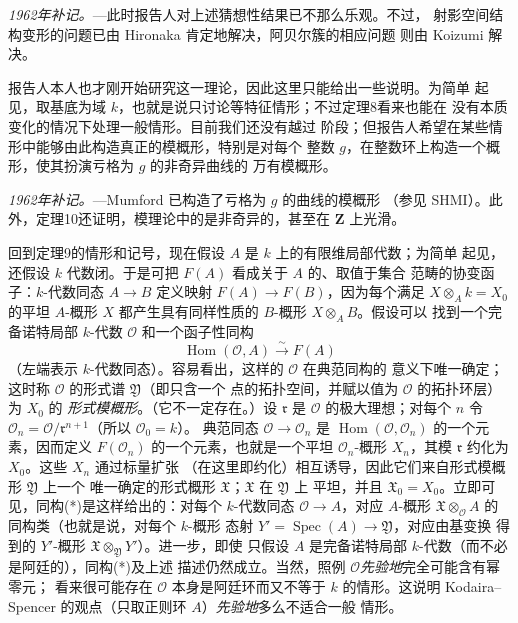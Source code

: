 \emph{1962年补记。}---此时报告人对上述猜想性结果已不那么乐观。不过，
射影空间结构变形的问题已由 Hironaka 肯定地解决，阿贝尔簇的相应问题
则由 Koizumi 解决。


报告人本人也才刚开始研究这一理论，因此这里只能给出一些说明。为简单
起见，取基底为域 $k$，也就是说只讨论等特征情形；不过定理8看来也能在
没有本质变化的情况下处理一般情形。目前我们还没有越过
阶段；但报告人希望在某些情形中能够由此构造真正的模概形，特别是对每个
整数 $g$，在整数环上构造一个概形，使其扮演亏格为 $g$ 的非奇异曲线的
万有模概形。

\emph{1962年补记。}---Mumford 已构造了亏格为 $g$ 的曲线的模概形
（参见 SHMI）。此外，定理10还证明，模理论中的是非奇异的，甚至在 $\mathbf Z$ 上光滑。

回到定理9的情形和记号，现在假设 $A$ 是 $k$ 上的有限维局部代数；为简单
起见，还假设 $k$ 代数闭。于是可把 $F(A)$ 看成关于 $A$ 的、取值于集合
范畴的协变函子：$k$-代数同态 $A\longrightarrow B$ 定义映射
$F(A)\longrightarrow F(B)$，因为每个满足 $X\otimes_A k=X_0$ 的平坦
$A$-概形 $X$ 都产生具有同样性质的 $B$-概形 $X\otimes_A B$。假设可以
找到一个完备诺特局部 $k$-代数 $\mathcal O$ 和一个函子性同构
\begin{equation}
  \tag{*}
  \operatorname{Hom}(\mathcal O,A)\xrightarrow{\sim}F(A)
\end{equation}
（左端表示 $k$-代数同态）。容易看出，这样的 $\mathcal O$ 在典范同构的
意义下唯一确定；这时称 $\mathcal O$ 的形式谱 $\mathfrak Y$（即只含一个
点的拓扑空间，并赋以值为 $\mathcal O$ 的拓扑环层）为 $X_0$ 的
\emph{形式模概形}。（它不一定存在。）设 $\mathfrak r$ 是 $\mathcal O$
的极大理想；对每个 $n$ 令
$\mathcal O_n=\mathcal O/\mathfrak r^{n+1}$（所以 $\mathcal O_0=k$）。
典范同态 $\mathcal O\longrightarrow\mathcal O_n$ 是
$\operatorname{Hom}(\mathcal O,\mathcal O_n)$ 的一个元素，因而定义
$F(\mathcal O_n)$ 的一个元素，也就是一个平坦 $\mathcal O_n$-概形
$X_n$，其模 $\mathfrak r$ 约化为 $X_0$。这些 $X_n$ 通过标量扩张
（在这里即约化）相互诱导，因此它们来自形式模概形 $\mathfrak Y$ 上一个
唯一确定的形式概形 $\mathfrak X$；$\mathfrak X$ 在 $\mathfrak Y$ 上
平坦，并且 $\mathfrak X_0=X_0$。立即可见，同构(*)是这样给出的：对每个
$k$-代数同态 $\mathcal O\longrightarrow A$，对应 $A$-概形
$\mathfrak X\otimes_{\mathcal O}A$ 的同构类（也就是说，对每个 $k$-概形
态射 $Y'=\operatorname{Spec}(A)\longrightarrow\mathfrak Y$，对应由基变换
得到的 $Y'$-概形 $\mathfrak X\otimes_{\mathfrak Y}Y'$）。进一步，即使
只假设 $A$ 是完备诺特局部 $k$-代数（而不必是阿廷的），同构(*)及上述
描述仍然成立。当然，照例 $\mathcal O$\textit{先验地}完全可能含有幂零元；
看来很可能存在 $\mathcal O$ 本身是阿廷环而又不等于 $k$ 的情形。这说明
Kodaira--Spencer 的观点（只取正则环 $A$）\textit{先验地}多么不适合一般
情形。

